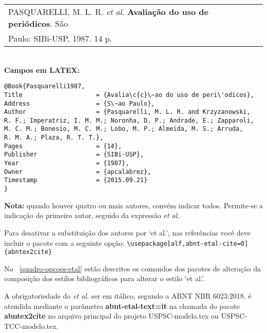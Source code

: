 \begin{tabular}{|l|c|} \hline
PASQUARELLI, M. L. R. \textit{et al.} \textbf{Avalia\c{c}\~ao do uso de peri\'odicos}. 
S\~ao \\ Paulo: SIBi-USP, 1987. 14 p.\\\hline
\end{tabular}\\

\textbf{Campos em LATEX:}

\begin{verbatim}
@Book{Pasquarelli1987,
Title                    = {Avalia\c{c}\~ao do uso de peri\'odicos},
Address                  = {S\~ao Paulo},
Author                   = {Pasquarelli, M. L. R. and Krzyzanowski,
R. F.; Imperatriz, I. M. M.; Noronha, D. P.; Andrade, E.; Zapparoli,
M. C. M.; Bonesio, M. C. M.; Lobo, M. P.; Almeida, M. S.; Arruda, 
R. M. A.; Plaza, R. T. T.},
Pages                    = {14},
Publisher                = {SIBi-USP},
Year                     = {1987},
Owner                    = {apcalabrez},
Timestamp                = {2015.09.21}
}
\end{verbatim}

\textbf{Nota:} quando houver quatro ou mais autores, conv\'em indicar todos. Permite-se a indica\c{c}\~ao do primeiro autor, seguido da express\~ao \textit{et al.} 

Para desativar a substitui\c{c}\~ao dos autores por ‘et al.’, nas refer\^encias voc\^e deve incluir o pacote com a seguinte op\c{c}\~ao: \verb+\usepackage[alf,abnt-etal-cite=0]{abntex2cite}+

No ~\autoref{quadro-opcoes-etal} est\~ao descritos os comandos dos pacotes de altera\c{c}\~ao da composi\c{c}\~ao dos estilos bibliogr\'aficos para alterar o estilo ‘et al.’.

A obrigatoriedade do \textit{et al.} ser em it\'alico, segundo a ABNT NBR 6023:2018, \'e atendida mediante o par\^ametro \textbf{abnt-etal-text=it} na chamada do pacote \textbf{abntex2cite} no arquivo principal do projeto USPSC-modelo.tex ou USPSC-TCC-modelo.tex. 



